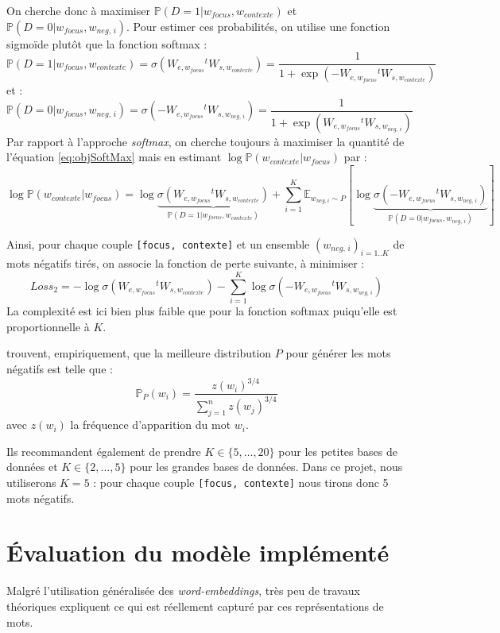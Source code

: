 \documentclass[11pt,french,french]{article}
\begin{document}
On cherche donc à maximiser
\(\mathbb P(D=1\vert w_{focus},w_{contexte})\) et
\(\mathbb P(D=0\vert w_{focus},w_{neg,\,i})\). Pour estimer ces
probabilités, on utilise une fonction sigmoïde plutôt que la fonction
softmax : \[
\mathbb P(D=1\vert w_{focus},w_{contexte})=\sigma(W_{e,w_{focus}}{}^tW_{s,w_{contexte}}) = 
\frac{1}{1+\exp(-W_{e,w_{focus}}{}^tW_{s,w_{contexte}})}
\] et : \[
\mathbb P(D=0\vert w_{focus},w_{neg,\,i})=\sigma(-W_{e,w_{focus}}{}^tW_{s,w_{neg,\,i}}) = 
\frac{1}{1+\exp(W_{e,w_{focus}}{}^tW_{s,w_{neg,\,i}})}
\] Par rapport à l'approche \emph{softmax}, on cherche toujours à
maximiser la quantité de l'équation \eqref{eq:objSoftMax} mais en estimant
\(\log\mathbb P(w_{contexte}\vert w_{focus})\) par : \[
\log\mathbb P(w_{contexte}\vert w_{focus}) =
\log\underbrace{\sigma (W_{e,w_{focus}}{}^tW_{s,w_{contexte}})}_{
\mathbb P(D=1\vert w_{focus},w_{contexte})
}+
\sum_{i=1}^K\mathbb E_{w_{neg,i}\sim P}[
\log
\underbrace{\sigma (-W_{e,w_{focus}}{}^tW_{s,w_{neg,\,i}})}_{
\mathbb P(D=0\vert w_{focus},w_{neg,\,i})
}
]
\]

Ainsi, pour chaque couple \texttt{{[}focus,\ contexte{]}} et un ensemble
\((w_{neg,\,i})_{i=1..K}\) de mots négatifs tirés, on associe la
fonction de perte suivante, à minimiser : \[
Loss_{2}=-\log\sigma (W_{e,w_{focus}}{}^tW_{s,w_{contexte}})
-
\sum_{i=1}^K
\log
\sigma (-W_{e,w_{focus}}{}^tW_{s,w_{neg,\,i}})
\] La complexité est ici bien plus faible que pour la fonction softmax
puiqu'elle est proportionnelle à \(K\).

\cite{MikolovNS} trouvent, empiriquement, que la meilleure distribution
\(P\) pour générer les mots négatifs est telle que : \[
\mathbb P_P(w_i) = \frac{z(w_i)^{3/4}}{
\sum_{j=1}^n z(w_j)^{3/4}
}
\] avec \(z(w_i)\) la fréquence d'apparition du mot \(w_i\).

Ils recommandent également de prendre \(K\in\{5,\dots,20\}\) pour les
petites bases de données et \(K\in\{2,\dots,5\}\) pour les grandes bases
de données. Dans ce projet, nous utiliserons \(K=5\) : pour chaque
couple \texttt{{[}focus,\ contexte{]}} nous tirons donc 5 mots négatifs.

\section{Évaluation du modèle implémenté}\label{sec:evaluation}

Malgré l'utilisation généralisée des \emph{word-embeddings}, très peu de
travaux théoriques expliquent ce qui est réellement capturé par ces
représentations de mots.
\end{document}

